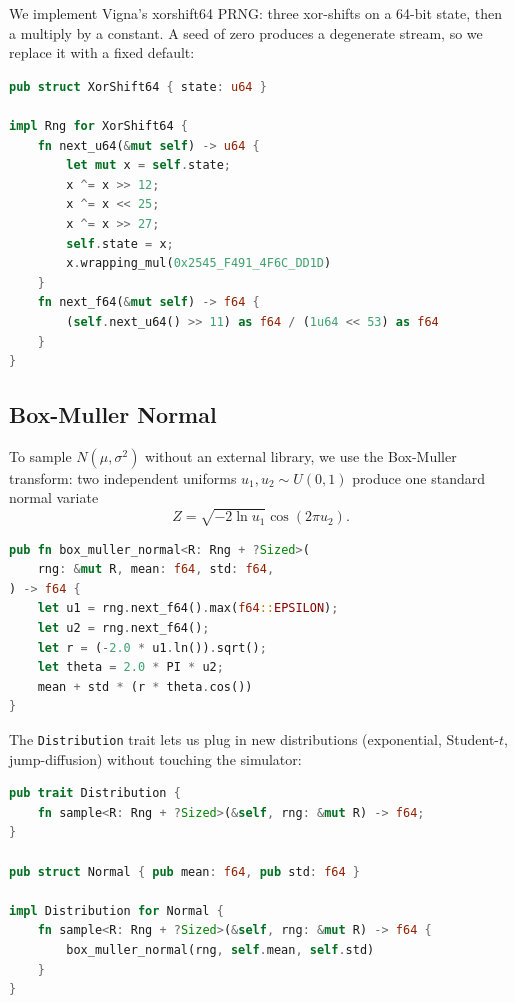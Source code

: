 
We implement Vigna's xorshift64\* PRNG: three xor-shifts on a 64-bit state,
then a multiply by a constant. A seed of zero produces a degenerate stream,
so we replace it with a fixed default:

\begin{lstlisting}[language=Rust]
pub struct XorShift64 { state: u64 }

impl Rng for XorShift64 {
    fn next_u64(&mut self) -> u64 {
        let mut x = self.state;
        x ^= x >> 12;
        x ^= x << 25;
        x ^= x >> 27;
        self.state = x;
        x.wrapping_mul(0x2545_F491_4F6C_DD1D)
    }
    fn next_f64(&mut self) -> f64 {
        (self.next_u64() >> 11) as f64 / (1u64 << 53) as f64
    }
}
\end{lstlisting}

\subsection{Box-Muller Normal}

To sample $N(\mu, \sigma^2)$ without an external library, we use the
Box-Muller transform: two independent uniforms $u_1, u_2 \sim U(0,1)$ produce
one standard normal variate
\[
Z = \sqrt{-2 \ln u_1} \cos(2\pi u_2).
\]

\begin{lstlisting}[language=Rust]
pub fn box_muller_normal<R: Rng + ?Sized>(
    rng: &mut R, mean: f64, std: f64,
) -> f64 {
    let u1 = rng.next_f64().max(f64::EPSILON);
    let u2 = rng.next_f64();
    let r = (-2.0 * u1.ln()).sqrt();
    let theta = 2.0 * PI * u2;
    mean + std * (r * theta.cos())
}
\end{lstlisting}

The \texttt{Distribution} trait lets us plug in new distributions (exponential,
Student-$t$, jump-diffusion) without touching the simulator:

\begin{lstlisting}[language=Rust]
pub trait Distribution {
    fn sample<R: Rng + ?Sized>(&self, rng: &mut R) -> f64;
}

pub struct Normal { pub mean: f64, pub std: f64 }

impl Distribution for Normal {
    fn sample<R: Rng + ?Sized>(&self, rng: &mut R) -> f64 {
        box_muller_normal(rng, self.mean, self.std)
    }
}
\end{lstlisting}

